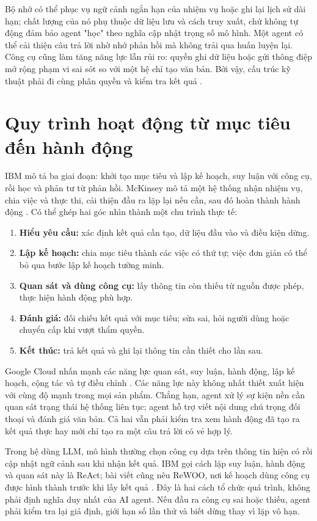 \documentclass[12pt,a4paper]{report}
\begin{document}
Bộ nhớ có thể phục vụ ngữ cảnh ngắn hạn của nhiệm vụ hoặc ghi lại lịch sử dài hạn;
chất lượng của nó phụ thuộc dữ liệu lưu và cách truy xuất, chứ không tự động đảm bảo
agent "học" theo nghĩa cập nhật trọng số mô hình. Một agent có thể cải thiện câu trả
lời nhờ nhớ phản hồi mà không trải qua huấn luyện lại. Công cụ cũng làm tăng năng lực
lẫn rủi ro: quyền ghi dữ liệu hoặc gửi thông điệp mở rộng phạm vi sai sót so với một
hệ chỉ tạo văn bản. Bởi vậy, cấu trúc kỹ thuật phải đi cùng phân quyền và kiểm tra
kết quả \cite{google,ibm}.

\section{Quy trình hoạt động từ mục tiêu đến hành động}
IBM mô tả ba giai đoạn: khởi tạo mục tiêu và lập kế hoạch, suy luận với công cụ, rồi
học và phản tư từ phản hồi. McKinsey mô tả một hệ thống nhận nhiệm vụ, chia việc và
thực thi, cải thiện đầu ra lặp lại nếu cần, sau đó hoàn thành hành động
\cite{ibm,mckinsey}. Có thể ghép hai góc nhìn thành một chu trình thực tế:
\begin{enumerate}
\item \textbf{Hiểu yêu cầu:} xác định kết quả cần tạo, dữ liệu đầu vào và điều kiện dừng.
\item \textbf{Lập kế hoạch:} chia mục tiêu thành các việc có thứ tự; việc đơn giản có thể bỏ qua bước lập kế hoạch tường minh.
\item \textbf{Quan sát và dùng công cụ:} lấy thông tin còn thiếu từ nguồn được phép, thực hiện hành động phù hợp.
\item \textbf{Đánh giá:} đối chiếu kết quả với mục tiêu; sửa sai, hỏi người dùng hoặc chuyển cấp khi vượt thẩm quyền.
\item \textbf{Kết thúc:} trả kết quả và ghi lại thông tin cần thiết cho lần sau.
\end{enumerate}

Google Cloud nhấn mạnh các năng lực quan sát, suy luận, hành động, lập kế hoạch, cộng
tác và tự điều chỉnh \cite{google}. Các năng lực này không nhất thiết xuất hiện với
cùng độ mạnh trong mọi sản phẩm. Chẳng hạn, agent xử lý sự kiện nền cần quan sát trạng
thái hệ thống liên tục; agent hỗ trợ viết nội dung chú trọng đối thoại và đánh giá văn
bản. Cả hai vẫn phải kiểm tra xem hành động đã tạo ra kết quả thực hay mới chỉ tạo ra
một câu trả lời có vẻ hợp lý.

Trong hệ dùng LLM, mô hình thường chọn công cụ dựa trên thông tin hiện có rồi cập
nhật ngữ cảnh sau khi nhận kết quả. IBM gọi cách lặp suy luận, hành động và quan sát
này là ReAct; bài viết cũng nêu ReWOO, nơi kế hoạch dùng công cụ được hình thành trước
khi lấy kết quả \cite{ibm}. Đây là hai cách tổ chức quá trình, không phải định nghĩa
duy nhất của AI agent. Nếu đầu ra công cụ sai hoặc thiếu, agent phải kiểm tra lại giả
định, giới hạn số lần thử và biết dừng thay vì lặp vô hạn.
\end{document}
